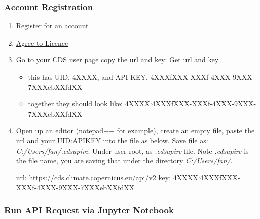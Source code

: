 \documentclass[
]{book}
\newenvironment{Shaded}{\begin{snugshade}}{\end{snugshade}}
\newcommand{\ExtensionTok}[1]{#1}
\newcommand{\NormalTok}[1]{#1}
\providecommand{\tightlist}{%
  \setlength{\itemsep}{0pt}\setlength{\parskip}{0pt}}
\begin{document}
\hypertarget{account-registration}{%
\subsubsection{Account Registration}\label{account-registration}}

\begin{enumerate}
\def\labelenumi{\arabic{enumi}.}
\item
  Register for an \href{cds.climate.copernicus.eu}{account}
\item
  \href{https://cds.climate.copernicus.eu/cdsapp/\#!/terms/licence-to-use-copernicus-products}{Agree to Licence}
\item
  Go to your CDS user page copy the url and key: \href{https://cds.climate.copernicus.eu/user}{Get url and key}

  \begin{itemize}
  \tightlist
  \item
    this has UID, 4XXXX, and API KEY, 4XXXfXXX-XXXf-4XXX-9XXX-7XXXebXXfdXX
  \item
    together they should look like: 4XXXX:4XXXfXXX-XXXf-4XXX-9XXX-7XXXebXXfdXX
  \end{itemize}
\item
  Open up an editor (notepad++ for example), create an empty file, paste the url and your UID:APIKEY into the file as below. Save file as: \emph{C:/Users/fan/.cdsapirc}. Under user root, as \emph{.cdsapirc} file. Note \emph{.cdsapirc} is the file name, you are saving that under the directory \emph{C:/Users/fan/}.

\begin{Shaded}
\begin{Highlighting}[]
\ExtensionTok{url}\NormalTok{: https://cds.climate.copernicus.eu/api/v2}
\ExtensionTok{key}\NormalTok{: 4XXXX:4XXXfXXX{-}XXXf{-}4XXX{-}9XXX{-}7XXXebXXfdXX}
\end{Highlighting}
\end{Shaded}
\end{enumerate}

\hypertarget{run-api-request-via-jupyter-notebook}{%
\subsubsection{Run API Request via Jupyter Notebook}\label{run-api-request-via-jupyter-notebook}}
\end{document}
